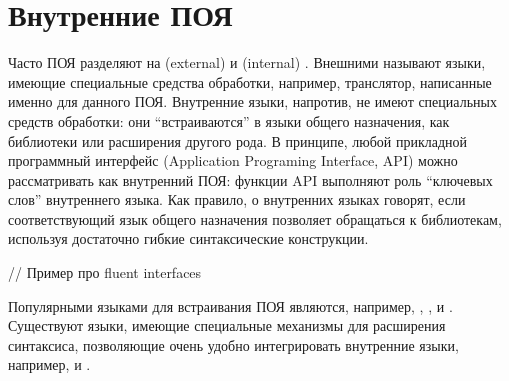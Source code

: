\section{Внутренние ПОЯ}

Часто ПОЯ разделяют на  (external) и  (internal) \cite{???}. Внешними называют языки, имеющие специальные средства обработки, например, транслятор, написанные именно для данного ПОЯ. Внутренние языки, напротив, не имеют специальных средств обработки: они ``встраиваются'' в языки общего назначения, как библиотеки или расширения другого рода. В принципе, любой прикладной программный интерфейс (Application Programing Interface, API) можно рассматривать как внутренний ПОЯ: функции API выполняют роль ``ключевых слов'' внутреннего языка. Как правило, о внутренних языках говорят, если соответствующий язык общего назначения позволяет обращаться к библиотекам, используя достаточно гибкие синтаксические конструкции.

// Пример про fluent interfaces

Популярными языками для встраивания ПОЯ являются, например,  \cite{???},  \cite{???},  \cite{???} и  \cite{???}. Существуют языки, имеющие специальные механизмы для расширения синтаксиса, позволяющие очень удобно интегрировать внутренние языки, например,  \cite{???} и  \cite{???}.
		
